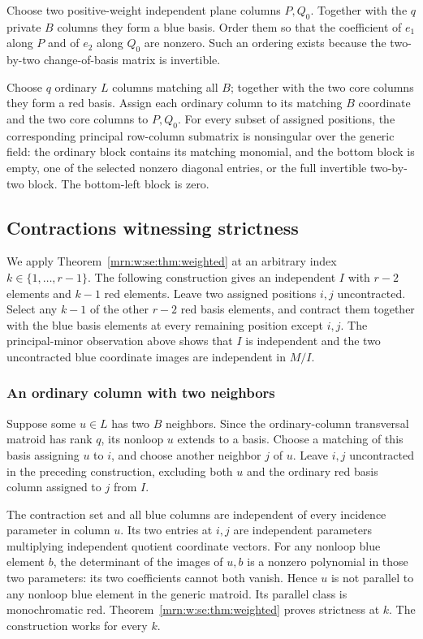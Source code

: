 \documentclass[11pt,a4paper]{article}
\theoremstyle{remark}\newtheorem{remark}[theorem]{Remark}
\begin{document}
Choose two positive-weight independent plane columns $P,Q_0$. Together with the $q$ private $B$ columns they form a blue basis. Order them so that the coefficient of $e_1$ along $P$ and of $e_2$ along $Q_0$ are nonzero. Such an ordering exists because the two-by-two change-of-basis matrix is invertible.

Choose $q$ ordinary $L$ columns matching all $B$; together with the two core columns they form a red basis. Assign each ordinary column to its matching $B$ coordinate and the two core columns to $P,Q_0$. For every subset of assigned positions, the corresponding principal row-column submatrix is nonsingular over the generic field: the ordinary block contains its matching monomial, and the bottom block is empty, one of the selected nonzero diagonal entries, or the full invertible two-by-two block. The bottom-left block is zero.

\subsection{Contractions witnessing strictness}
We apply Theorem~\ref{mrn:w:se:thm:weighted} at an arbitrary index $k\in\{1,\ldots,r-1\}$. The following construction gives an independent $I$ with $r-2$ elements and $k-1$ red elements. Leave two assigned positions $i,j$ uncontracted. Select any $k-1$ of the other $r-2$ red basis elements, and contract them together with the blue basis elements at every remaining position except $i,j$. The principal-minor observation above shows that $I$ is independent and the two uncontracted blue coordinate images are independent in $M/I$.

\subsubsection{An ordinary column with two neighbors}
Suppose some $u\in L$ has two $B$ neighbors. Since the ordinary-column transversal matroid has rank $q$, its nonloop $u$ extends to a basis. Choose a matching of this basis assigning $u$ to $i$, and choose another neighbor $j$ of $u$. Leave $i,j$ uncontracted in the preceding construction, excluding both $u$ and the ordinary red basis column assigned to $j$ from $I$.

The contraction set and all blue columns are independent of every incidence parameter in column $u$. Its two entries at $i,j$ are independent parameters multiplying independent quotient coordinate vectors. For any nonloop blue element $b$, the determinant of the images of $u,b$ is a nonzero polynomial in those two parameters: its two coefficients cannot both vanish. Hence $u$ is not parallel to any nonloop blue element in the generic matroid. Its parallel class is monochromatic red. Theorem~\ref{mrn:w:se:thm:weighted} proves strictness at $k$. The construction works for every $k$.
\end{document}
